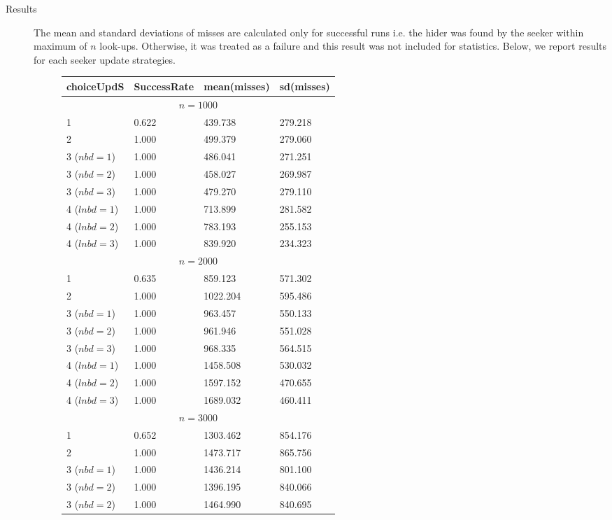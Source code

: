 \documentclass[11pt,a4paper,draft]{article}
\begin{document}
\begin{description}
	\item[Results] The mean and standard deviations of misses are calculated only for successful runs i.e. the hider was found by the seeker within maximum of $n$ look-ups. Otherwise, it was treated as a failure and this result was not included for statistics. Below, we report results for each seeker update strategies.
	\begin{figure}[!h]
	\centering
	\begin{tabular}{llll}
		\hline \hline 
		choiceUpdS & SuccessRate & mean(misses) & sd(misses) \\
		\hline \hline 
		\multicolumn{4}{c}{$n = 1000$} \\ 
		\hline 
		1 &  0.622 & 439.738 & 279.218 \\
		2 &  1.000 & 499.379 & 279.060 \\
		3 ($nbd=1$) & 1.000 & 486.041 & 271.251 \\
		3 ($nbd=2$) & 1.000 & 458.027 & 269.987 \\
		3 ($nbd=3$) & 1.000 & 479.270 & 279.110 \\
		4 ($lnbd=1$) & 1.000 & 713.899 & 281.582 \\
		4 ($lnbd=2$) & 1.000 & 783.193 & 255.153 \\
		4 ($lnbd=3$) & 1.000 & 839.920 & 234.323 \\
		\hline 
		\hline 
		\multicolumn{4}{c}{$n = 2000$} \\ 
		\hline 
		1 &  0.635 & 859.123 & 571.302 \\
		2 &  1.000 & 1022.204 & 595.486 \\
		3 ($nbd=1$) & 1.000 & 963.457 & 550.133 \\
		3 ($nbd=2$) & 1.000 & 961.946 & 551.028 \\
		3 ($nbd=3$) & 1.000 & 968.335 & 564.515 \\
		4 ($lnbd=1$) & 1.000 & 1458.508 & 530.032 \\
		4 ($lnbd=2$) & 1.000 & 1597.152 & 470.655 \\
		4 ($lnbd=3$) & 1.000 & 1689.032 & 460.411 \\
		\hline 
		\hline 
		\multicolumn{4}{c}{$n = 3000$} \\ 
		\hline 
		1 &  0.652 & 1303.462 & 854.176 \\
		2 &  1.000 & 1473.717 & 865.756 \\
		3 ($nbd=1$) & 1.000 & 1436.214 & 801.100 \\
		3 ($nbd=2$) & 1.000 & 1396.195 & 840.066 \\
		3 ($nbd=2$) & 1.000 & 1464.990 & 840.695 \\

\end{tabular}
\end{figure}
\end{description}
\end{document}
